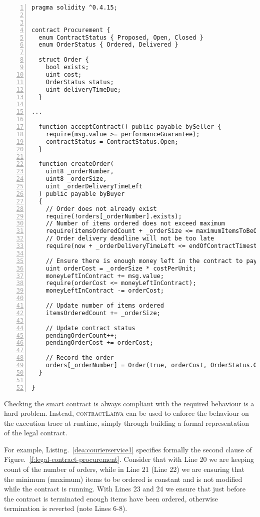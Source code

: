 \documentclass{article}
\newcommand{\contractlarva}{\textsc{contractLarva}\xspace}
\begin{document}
    \small\begin{lstlisting}[language=DEA,basicstyle=\scriptsize,numbers=left,numbersep=2pt,xleftmargin=0.3cm,label={lt:courierservice}]
pragma solidity ^0.4.15;


contract Procurement {
  enum ContractStatus { Proposed, Open, Closed }
  enum OrderStatus { Ordered, Delivered }

  struct Order {
    bool exists;
    uint cost;
    OrderStatus status;
    uint deliveryTimeDue;
  }

...

  function acceptContract() public payable bySeller {
    require(msg.value >= performanceGuarantee);
    contractStatus = ContractStatus.Open;
  }

  function createOrder(
    uint8 _orderNumber,
    uint8 _orderSize,
    uint _orderDeliveryTimeLeft
  ) public payable byBuyer 
  {
    // Order does not already exist
    require(!orders[_orderNumber].exists);
    // Number of items ordered does not exceed maximum
    require(itemsOrderedCount + _orderSize <= maximumItemsToBeOrdered);
    // Order delivery deadline will not be too late
    require(now + _orderDeliveryTimeLeft <= endOfContractTimestamp);

    // Ensure there is enough money left in the contract to pay for the order
    uint orderCost = _orderSize * costPerUnit;
    moneyLeftInContract += msg.value;
    require(orderCost <= moneyLeftInContract);
    moneyLeftInContract -= orderCost;
    
    // Update number of items ordered
    itemsOrderedCount += _orderSize;

    // Update contract status
    pendingOrderCount++;
    pendingOrderCost += orderCost;

    // Record the order
    orders[_orderNumber] = Order(true, orderCost, OrderStatus.Ordered, now+_orderDeliveryTimeLeft);
  }

}
    \end{lstlisting}\normalsize
    
   Checking the smart contract is always compliant with the required behaviour is a hard problem. Instead, \contractlarva can be used to enforce the behaviour on the execution trace at runtime, simply through building a formal representation of the legal contract. 
   
   For example, Listing.~\ref{dea:courierservice1} specifies formally the second clause of Figure.~\ref{f:legal-contract-procurement}. Consider that with Line 20 we are keeping count of the number of orders, while in Line 21 (Line 22) we are ensuring that the minimum (maximum) items to be ordered is constant and is not modified while the contract is running. With Lines 23 and 24 we ensure that just before the contract is terminated enough items have been ordered, otherwise termination is reverted (note Lines 6-8). 
     
\end{document}
